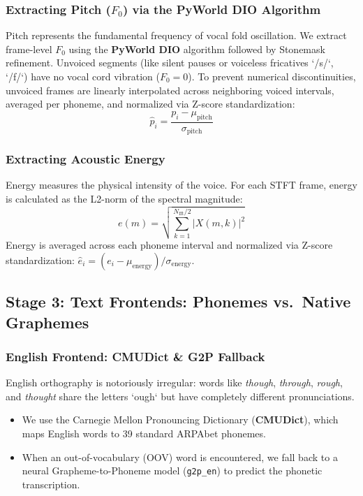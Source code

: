 \documentclass[11pt,a4paper]{article}
\begin{document}
\subsubsection{Extracting Pitch ($F_0$) via the PyWorld DIO Algorithm}
Pitch represents the fundamental frequency of vocal fold oscillation. We extract frame-level $F_0$ using the \textbf{PyWorld DIO} algorithm followed by Stonemask refinement. 
Unvoiced segments (like silent pauses or voiceless fricatives `/s/`, `/f/`) have no vocal cord vibration ($F_0 = 0$). To prevent numerical discontinuities, unvoiced frames are linearly interpolated across neighboring voiced intervals, averaged per phoneme, and normalized via Z-score standardization:
\begin{equation}
\hat{p}_i = \frac{p_i - \mu_{\text{pitch}}}{\sigma_{\text{pitch}}}
\end{equation}

\subsubsection{Extracting Acoustic Energy}
Energy measures the physical intensity of the voice. For each STFT frame, energy is calculated as the L2-norm of the spectral magnitude:
\begin{equation}
e(m) = \sqrt{\sum_{k=1}^{N_{\text{fft}}/2} |X(m, k)|^2}
\end{equation}
Energy is averaged across each phoneme interval and normalized via Z-score standardization: $\hat{e}_i = (e_i - \mu_{\text{energy}}) / \sigma_{\text{energy}}$.

\subsection{Stage 3: Text Frontends: Phonemes vs.\ Native Graphemes}

\subsubsection{English Frontend: CMUDict \& G2P Fallback}
English orthography is notoriously irregular: words like \textit{though}, \textit{through}, \textit{rough}, and \textit{thought} share the letters `ough` but have completely different pronunciations.
\begin{itemize}
  \item We use the Carnegie Mellon Pronouncing Dictionary (\textbf{CMUDict}), which maps English words to 39 standard ARPAbet phonemes.
  \item When an out-of-vocabulary (OOV) word is encountered, we fall back to a neural Grapheme-to-Phoneme model (\texttt{g2p\_en}) to predict the phonetic transcription.
\end{itemize}
\end{document}
